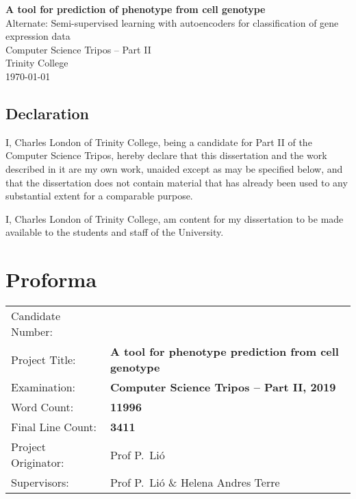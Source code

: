 \documentclass[12pt,a4paper,twoside,openany]{report}
\begin{document}

\pagestyle{empty}


\vspace*{60mm}
\begin{center}
\Huge
\textbf{A tool for prediction of phenotype from cell genotype} \\[5mm]
{\Large Alternate: Semi-supervised learning with autoencoders for classification of gene expression data} \\[5mm]
Computer Science Tripos -- Part II \\[5mm]
Trinity College \\[5mm]
\today  %
\end{center}


\pagestyle{plain}
 
\newpage
\section*{Declaration}

I, Charles London of Trinity College, being a candidate for Part II of the Computer
Science Tripos, hereby declare
that this dissertation and the work described in it are my own work,
unaided except as may be specified below, and that the dissertation
does not contain material that has already been used to any substantial
extent for a comparable purpose. 

I, Charles London of Trinity College, 
am content for my dissertation to be made available to the students and staff of the University.

\bigskip
{}

\medskip
{}

\chapter*{Proforma}

{\large
\begin{tabular}{ll}
Candidate Number:   & \bf                    \\
Project Title:      & \bf A tool for phenotype prediction from cell genotype  \\
Examination:        & \bf Computer Science Tripos -- Part II, 2019  \\
Word Count:         & \bf 11996\footnotemark[1]  \\
Final Line Count:   & \bf 3411\\
Project Originator: & Prof P.~Li\'o                   \\
Supervisors:         & Prof P.~Li\'o \& Helena Andres Terre                   \\ 
\end{tabular}
}
\end{document}
